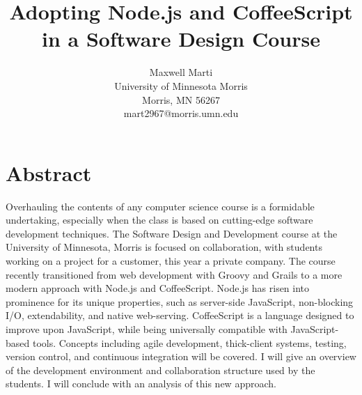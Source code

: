 \documentclass[12pt]{article}
\newcommand{\comment}[1]{{\bf \tt  {#1}}}
\begin{document}
\pagestyle{plain}
%




\title{Adopting Node.js and CoffeeScript in a Software Design Course}
%
%




\author{
Maxwell Marti \\
University of Minnesota Morris\\
Morris, MN 56267\\
mart2967@morris.umn.edu
}




\date{}




\maketitle
\thispagestyle{empty}


\section*{\centering Abstract}
Overhauling the contents of any computer science course is a formidable undertaking, especially when the class is based on cutting-edge software development techniques. The Software Design and Development course at the University of Minnesota, Morris is focused on collaboration, with students working on a project for a customer, this year a private company. The course   recently transitioned from web development with Groovy and Grails to a more modern approach with Node.js and CoffeeScript. Node.js has risen into prominence for its unique properties, such as server-side JavaScript, non-blocking I/O, extendability, and native web-serving. CoffeeScript is a language designed to improve upon JavaScript, while being universally compatible with JavaScript-based tools. Concepts including agile development, thick-client systems, testing, version control, and continuous integration will be covered. I will give an overview of the development environment and collaboration structure used by the students. I will conclude with an analysis of this new approach.
\end{document}
